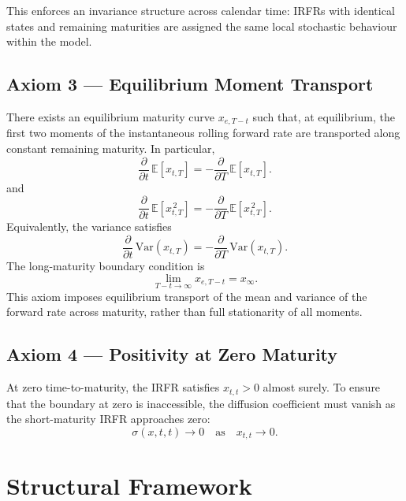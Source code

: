 \documentclass[12pt]{article}
\theoremstyle{statementstyle}
\begin{document}
This enforces an invariance structure across calendar time: IRFRs with
identical states and remaining maturities are assigned the same local
stochastic behaviour within the model.

\subsection*{Axiom 3 --- Equilibrium Moment Transport}
\label{ax:equilibrium}

There exists an equilibrium maturity curve $x_{e,T-t}$ such that, at
equilibrium, the first two moments of the instantaneous rolling forward
rate are transported along constant remaining maturity. In particular,
\begin{equation}
\frac{\partial}{\partial t}\,\mathbb{E}[x_{t,T}]
=
-\frac{\partial}{\partial T}\,\mathbb{E}[x_{t,T}].
\tag{2.0.3}
\end{equation}
and
\begin{equation}
\frac{\partial}{\partial t}\,\mathbb{E}[x_{t,T}^{\,2}]
=
-\frac{\partial}{\partial T}\,\mathbb{E}[x_{t,T}^{\,2}].
\tag{2.0.4}
\end{equation}
Equivalently, the variance satisfies
\begin{equation}
\frac{\partial}{\partial t}\,\mathrm{Var}(x_{t,T})
=
-\frac{\partial}{\partial T}\,\mathrm{Var}(x_{t,T}).
\tag{2.0.5}
\end{equation}
The long-maturity boundary condition is
\[
\lim_{T-t\to\infty} x_{e,T-t} = x_{\infty}.
\]
This axiom imposes equilibrium transport of the mean and variance of the
forward rate across maturity, rather than full stationarity of all
moments.

\subsection*{Axiom 4 --- Positivity at Zero Maturity}
\label{ax:positivity}

At zero time-to-maturity, the IRFR satisfies $x_{t,t}>0$ almost surely. 
To ensure that the boundary at zero is inaccessible, the diffusion 
coefficient must vanish as the short-maturity IRFR approaches zero:
\[
\sigma(x,t,t)\longrightarrow 0
\quad\text{as}\quad x_{t,t}\to 0.
\]
\section{Structural Framework}
\label{sec:framework}
\end{document}
